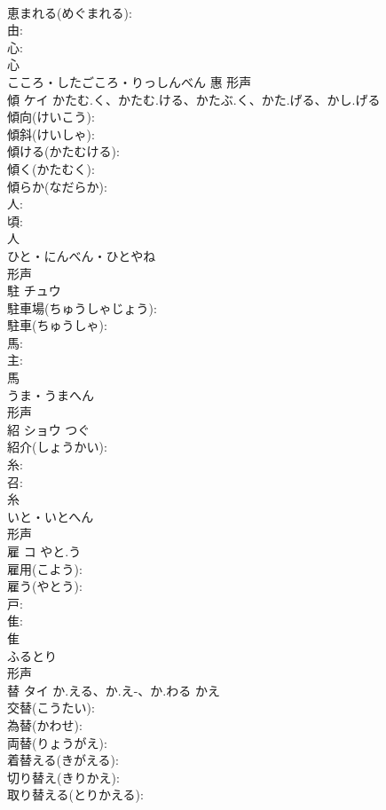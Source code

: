 \documentclass[8pt]{extreport}
\begin{document}
\begin{CJK}{UTF8}{min}
\\	恵まれる(めぐまれる): 
\\	由: 
\\	心: 
\\	心	
\\	こころ・したごころ・りっしんべん	惠	形声 
\\	傾	ケイ	かたむ.く、かたむ.ける、かたぶ.く、かた.げる、かし.げる		
\\	傾向(けいこう): 
\\	傾斜(けいしゃ): 
\\	傾ける(かたむける): 
\\	傾く(かたむく): 
\\	傾らか(なだらか): 
\\	人: 
\\	頃: 
\\	人	
\\	ひと・にんべん・ひとやね	
\\	形声 
\\	駐	チュウ			
\\	駐車場(ちゅうしゃじょう): 
\\	駐車(ちゅうしゃ): 
\\	馬: 
\\	主: 
\\	馬	
\\	うま・うまへん	
\\	形声 
\\	紹	ショウ		つぐ	
\\	紹介(しょうかい): 
\\	糸: 
\\	召: 
\\	糸	
\\	いと・いとへん	
\\	形声 
\\	雇	コ	やと.う		
\\	雇用(こよう): 
\\	雇う(やとう): 
\\	戸: 
\\	隹: 
\\	隹	
\\	ふるとり	
\\	形声 
\\	替	タイ	か.える、か.え-、か.わる	かえ	
\\	交替(こうたい): 
\\	為替(かわせ): 
\\	両替(りょうがえ): 
\\	着替える(きがえる): 
\\	切り替え(きりかえ): 
\\	取り替える(とりかえる): 

\end{CJK}
\end{document}
